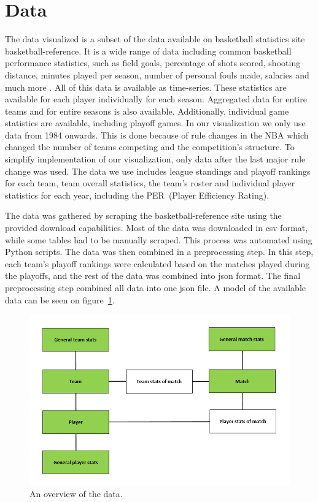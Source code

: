 \documentclass[]{sigchi}
\begin{document}
\section{Data}\label{sec:data}
The data visualized is a subset of the data available on basketball statistics
site basketball-reference\cite{basketball-reference}. It is a wide range of data including common basketball performance statistics, such as field goals, percentage of shots scored, shooting distance, minutes played per season, number of personal fouls made, salaries and much more . All of this data is available as time-series. These statistics are available for each player individually for each season. Aggregated data for entire teams and for entire seasons is also available. Additionally, individual game statistics are available, including playoff games. In our visualization we only use data from 1984 onwards. This is done because of rule changes in the NBA which changed the number of teams competing and the
competition's structure. To simplify implementation of our visualization, only
data after the last major rule change was used.  The data we use includes league
standings and playoff rankings for each team, team overall statistics, the
team's roster and individual player statistics for each year, including the
PER~(Player Efficiency Rating)\cite{per}. 

The data was gathered by scraping the basketball-reference site using the
provided download capabilities. Most of the data was downloaded in csv format,
while some tables had to be manually scraped. This process was automated using
Python scripts. The data was then combined in a preprocessing step. In this
step, each team's playoff rankings were calculated based on the matches played
during the playoffs, and the rest of the data was combined into json format. The
final preprocessing step combined all data into one json file. A model of the
available data can be seen on figure~\ref{fig:data}.

\begin{figure}
\centering
  \includegraphics[width=1.0\columnwidth]{figures/data}
  \caption{An overview of the data.}
  \label{fig:data}
\end{figure}
\end{document}
